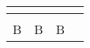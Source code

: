 {

    \Fontskrivan\bfseries\slshape
\fontsize{15pt}{12pt}\selectfont

\begin{tabular}{|*{4}{C|}}
    \hline
     \\
    \hline
      &   &   &   \\
    \hline
    B & B &  B & \\
    \hline
\end{tabular}

}